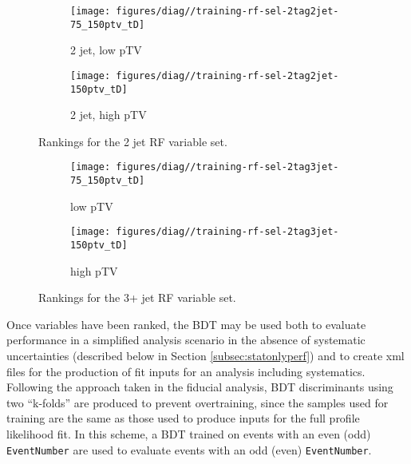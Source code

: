\begin{figure}[!htbp]\captionsetup{justification=centering}
  \centering
\begin{subfigure}[t]{0.49\textwidth}\centering\texttt{[image: figures/diag//training-rf-sel-2tag2jet-75\_150ptv\_tD]}\caption{2 jet, low pTV}\end{subfigure}
\begin{subfigure}[t]{0.49\textwidth}\centering\texttt{[image: figures/diag//training-rf-sel-2tag2jet-150ptv\_tD]}\caption{2 jet, high pTV}\end{subfigure}
  \caption{Rankings for the 2 jet RF variable set.}
  \label{fig:rf-sel-Ranking}
\end{figure}
\begin{figure}[!htbp]\captionsetup{justification=centering}
  \centering
\begin{subfigure}[t]{0.49\textwidth}\centering\texttt{[image: figures/diag//training-rf-sel-2tag3jet-75\_150ptv\_tD]}\caption{low pTV}\end{subfigure}
\begin{subfigure}[t]{0.49\textwidth}\centering\texttt{[image: figures/diag//training-rf-sel-2tag3jet-150ptv\_tD]}\caption{high pTV}\end{subfigure}
  \caption{Rankings for the 3+ jet RF variable set.}
  \label{fig:rf-sel-Ranking3}
\end{figure}

Once variables have been ranked, the BDT may be used both to evaluate performance in a simplified analysis scenario in the absence of systematic uncertainties (described below in Section \ref{subsec:statonlyperf}) and to create xml files for the production of fit inputs for an analysis including systematics.  Following the approach taken in the fiducial analysis, BDT discriminants using two ``k-folds'' are produced to prevent overtraining, since the samples used for training are the same as those used to produce inputs for the full profile likelihood fit.  In this scheme, a BDT trained on events with an even (odd) \texttt{EventNumber} are used to evaluate events with an odd (even) \texttt{EventNumber}.

